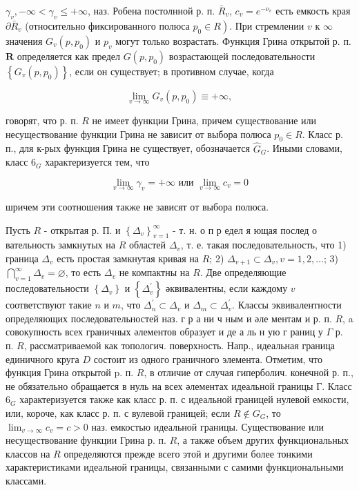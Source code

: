 \documentclass[10pt]{article}
\begin{document}
$\gamma_{v},-\infty<\gamma_{v} \leqslant+\infty$, наз. Робена постолнной р. п. $\bar{R}_{v}$, $c_{v}=e^{-\nu_{v}}$ есть емкость края $\partial \bar{R}_{v}$ (относительно фиксированного полюса $\left.p_{0} \in R\right)$. При стремлении $v$ к $\infty$ значения $G_{v}\left(p, p_{0}\right)$ и $p_{v}$ могут только возрастать. Функция Грина открытой р. п. $\boldsymbol{R}$ определяется как предел $G\left(p, p_{0}\right)$ возрастающей последовательности $\left\{G_{v}\left(p, p_{0}\right)\right\}$, если он существует; в противном случае, когда



\[

\lim _{v \rightarrow \infty} G_{v}\left(p, p_{0}\right) \equiv+\infty,

\]



говорят, что р. п. $R$ не имеет функции Грина, причем существование или несуществование функции Грина не зависит от выбора полюса $p_{0} \in R$. Класс р. п., для к-рых функция Грина не существует, обозначается $\widehat{G}_{G}$. Иными словами, класс $6_{G}$ характеризуется тем, что



\[

\lim _{v \rightarrow \infty} \gamma_{v}=+\infty \text { или } \lim _{v \rightarrow \infty} c_{v}=0

\]



шричем эти соотношения также не зависят от выбора полюса.



Пусть $R$ - открытая р. П. и $\left\{\Delta_{v}\right\}_{v=1}^{\infty}$ - т. н. о п р едел я ющая послед о вательность замкнутых на $R$ областей $\Delta_{v}$, т. е. такая последовательность, что 1) граница $\Delta_{v}$ есть простая замкнутая кривая на $R$; 2) $\Delta_{v+1} \subset \Delta_{v}, v=1,2, \ldots$; 3) $\bigcap_{v=1}^{\infty} \Delta_{v}=\varnothing$, то есть $\Delta_{v}$ не компактны на $R$. Две определяющие последовательности $\left\{\Delta_{v}\right\}$ и $\left\{\Delta_{v}^{\prime}\right\}$ әквивалентны, если каждому $v$ соответствуют такие $n$ и $m$, что $\Delta_{n}^{\prime} \subset \Delta_{v}$ и $\Delta_{m} \subset \Delta_{v}^{\prime}$. Классы эквивалентности определяющих последовательностей наз. г р а ни ч ным и әле ментам и р. п. $R$, a совокупность всех граничных әлементов образует и де а ль н ую г раниц у $\Gamma$ р. п. $R$, рассматриваемой как топологич. поверхность. Напр., идеальная граница единичного круга $D$ состоит из одного граничного элемента. Отметим, что функция Грина открытой p. п. $R$, в отличие от случая гиперболич. конечной р. п., не обязательно обращается в нуль на всех әлементах идеальной границы $Г$. Класс $6_{G}$ характеризуется также как класс р. п. с идеальной границей нулевой емкости, или, короче, как класс р. п. с вулевой границей; если $R \notin G_{G}$, то $\lim _{v \rightarrow \infty} c_{v}=c>0$ наз. емкостью идеальной границы. Существование или несуществование функции Грина р. п. $R$, а также объем других функциональных классов на $R$ определяются прежде всего этой и другими более тонкими характеристиками идеальной границы, связанными с самими функциональными классами.
\end{document}
